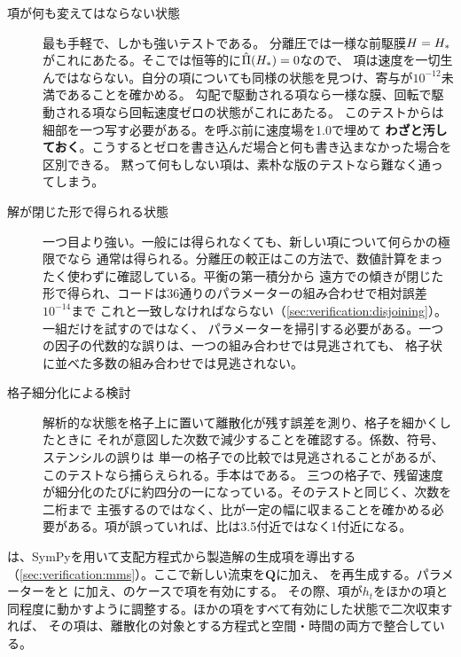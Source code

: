 \begin{description}

  \item[項が何も変えてはならない状態] 最も手軽で、しかも強いテストである。
    分離圧では一様な前駆膜$H = H_{*}$がこれにあたる。そこでは恒等的に$\hat{\Pi}(H_{*}) = 0$なので、
    項は速度を一切生んではならない。自分の項についても同様の状態を見つけ、寄与が$10^{-12}$未満であることを確かめる。
    勾配で駆動される項なら一様な膜、回転で駆動される項なら回転速度ゼロの状態がこれにあたる。
    このテストからは細部を一つ写す必要がある。を呼ぶ前に速度場を1.0で埋めて
    \textbf{わざと汚しておく}。こうするとゼロを書き込んだ場合と何も書き込まなかった場合を区別できる。
    黙って何もしない項は、素朴な版のテストなら難なく通ってしまう。

  \item[解が閉じた形で得られる状態] 一つ目より強い。一般には得られなくても、新しい項について何らかの極限でなら
    通常は得られる。分離圧の較正はこの方法で、数値計算をまったく使わずに確認している。平衡の第一積分から
    遠方での傾きが閉じた形で得られ、コードは36通りのパラメーターの組み合わせで相対誤差$10^{-14}$まで
    これと一致しなければならない（\cref{sec:verification:disjoining}）。一組だけを試すのではなく、
    パラメーターを掃引する必要がある。一つの因子の代数的な誤りは、一つの組み合わせでは見逃されても、
    格子状に並べた多数の組み合わせでは見逃されない。

  \item[格子細分化による検討] 解析的な状態を格子上に置いて離散化が残す誤差を測り、格子を細かくしたときに
    それが意図した次数で減少することを確認する。係数、符号、ステンシルの誤りは
    単一の格子での比較では見逃されることがあるが、このテストなら捕らえられる。手本はである。
    三つの格子で、残留速度が細分化のたびに約四分の一になっている。そのテストと同じく、次数を二桁まで
    主張するのではなく、比が一定の幅に収まることを確かめる必要がある。項が誤っていれば、比は3.5付近ではなく1付近になる。

\end{description}

\begin{tip}[製造解に項を加える]
  は、SymPyを用いて支配方程式から製造解の生成項を導出する
  （\cref{sec:verification:mms}）。ここで新しい流束を$\mathbf{Q}$に加え、
  を再生成する。パラメーターをと
  に加え、のケースで項を有効にする。
  その際、項が$h_t$をほかの項と同程度に動かすように調整する。ほかの項をすべて有効にした状態で二次収束すれば、
  その項は、離散化の対象とする方程式と空間・時間の両方で整合している。
\end{tip}

